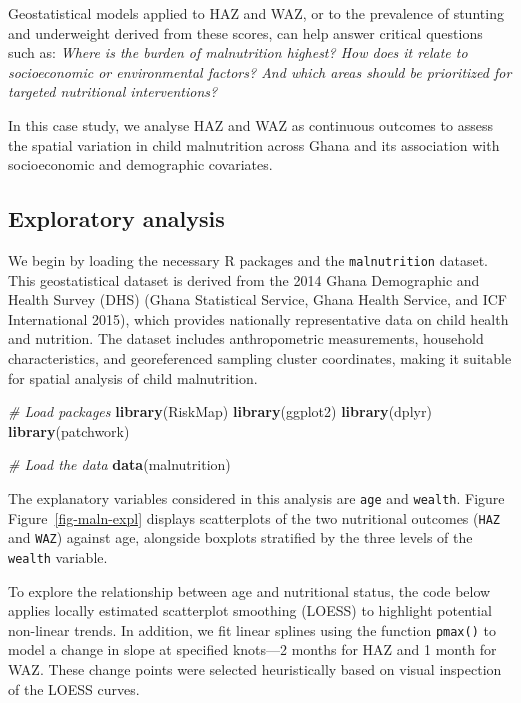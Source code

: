 \documentclass[
  letterpaper,
]{krantz}
\newenvironment{Shaded}{\begin{snugshade}}{\end{snugshade}}
\newcommand{\CommentTok}[1]{\textcolor[rgb]{0.56,0.35,0.01}{\textit{#1}}}
\newcommand{\FunctionTok}[1]{\textcolor[rgb]{0.13,0.29,0.53}{\textbf{#1}}}
\newcommand{\NormalTok}[1]{#1}
\begin{document}
Geostatistical models applied to HAZ and WAZ, or to the prevalence of
stunting and underweight derived from these scores, can help answer
critical questions such as: \emph{Where is the burden of malnutrition
highest? How does it relate to socioeconomic or environmental factors?
And which areas should be prioritized for targeted nutritional
interventions?}

In this case study, we analyse HAZ and WAZ as continuous outcomes to
assess the spatial variation in child malnutrition across Ghana and its
association with socioeconomic and demographic covariates.

\subsection{Exploratory analysis}\label{exploratory-analysis-1}

We begin by loading the necessary R packages and the
\texttt{malnutrition} dataset. This geostatistical dataset is derived
from the 2014 Ghana Demographic and Health Survey (DHS) (Ghana
Statistical Service, Ghana Health Service, and ICF International 2015),
which provides nationally representative data on child health and
nutrition. The dataset includes anthropometric measurements, household
characteristics, and georeferenced sampling cluster coordinates, making
it suitable for spatial analysis of child malnutrition.

\begin{Shaded}
\begin{Highlighting}[]
\CommentTok{\# Load packages}
\FunctionTok{library}\NormalTok{(RiskMap)}
\FunctionTok{library}\NormalTok{(ggplot2)}
\FunctionTok{library}\NormalTok{(dplyr)}
\FunctionTok{library}\NormalTok{(patchwork)}

\CommentTok{\# Load the data}
\FunctionTok{data}\NormalTok{(malnutrition)}
\end{Highlighting}
\end{Shaded}

The explanatory variables considered in this analysis are \texttt{age}
and \texttt{wealth}. Figure Figure~\ref{fig-maln-expl} displays
scatterplots of the two nutritional outcomes (\texttt{HAZ} and
\texttt{WAZ}) against age, alongside boxplots stratified by the three
levels of the \texttt{wealth} variable.

To explore the relationship between age and nutritional status, the code
below applies locally estimated scatterplot smoothing (LOESS) to
highlight potential non-linear trends. In addition, we fit linear
splines using the function \texttt{pmax()} to model a change in slope at
specified knots---2 months for HAZ and 1 month for WAZ. These change
points were selected heuristically based on visual inspection of the
LOESS curves.
\end{document}

